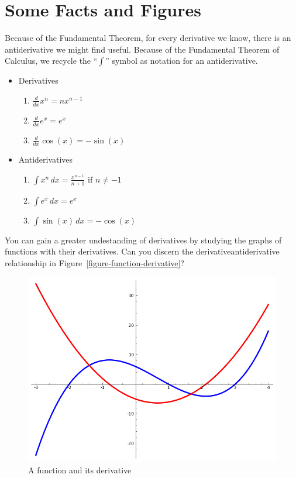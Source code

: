\documentclass[10pt,]{article}
\theoremstyle{plain}
\theoremstyle{definition}
\newcommand{\indefiniteintegral}[2]{\int#1\,d#2}
\begin{document}
\section{Some Facts and Figures}\label{section-5}
%
Because of the Fundamental Theorem, for every derivative we know, there is an antiderivative we might find useful.  Because of the Fundamental Theorem of Calculus, we recycle the ``$\int$'' symbol as notation for an antiderivative.
%
\begin{itemize}
\item Derivatives\begin{enumerate}
\item $\frac{d}{dx}x^n = nx^{n-1}$%
\item $\frac{d}{dx}e^x = e^x$%
\item $\frac{d}{dx}\cos(x) = -\sin(x)$%
\end{enumerate}
%
%
\item Antiderivatives\begin{enumerate}
\item $\indefiniteintegral{x^n}{x} = \displaystyle\frac{x^{n-1}}{n+1}\text{ if }n\neq -1$%
\item $\indefiniteintegral{e^x}{x} = e^x$%
\item $\indefiniteintegral{\sin(x)}{x} = -\cos(x)$%
\end{enumerate}
%
%
\end{itemize}
%
\par You can gain a greater undestanding of derivatives by studying the graphs of functions with their derivatives.  Can you discern the derivative\textendash antiderivative relationship in Figure~\cref{figure-function-derivative}?
%
\begin{figure}[!htbp]
\centering
\includegraphics[width=350pt,]{images/cubic-function.png}\caption{A function and its derivative\label{figure-1}}
\end{figure}
\end{document}
